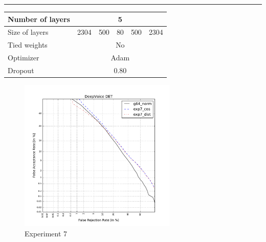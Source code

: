 \documentclass[conference]{IEEEtran}
\begin{document}
\hrule
\vspace{0.5cm}







\begin{table}[!h]
\centering
\begin{tabular}{|l|c|c|c|c|c|}
\hline
Number of layers & \multicolumn{5}{c|}{5}                \\ \hline
Size of layers   & 2304   & 500   & 80  & 500  & 2304   \\ \hline
Tied weights     & \multicolumn{5}{c|}{No}               \\ \hline
Optimizer        & \multicolumn{5}{c|}{Adam} \\ \hline
Dropout          & \multicolumn{5}{c|}{0.80} \\ \hline
\end{tabular}
\end{table}


\begin{figure}[!h]
    \centering
    \includegraphics[width=7.5cm]{../scores/det7.pdf}
    \captionsetup{labelformat=empty}
    \caption{Experiment 7}
\end{figure}
\end{document}
